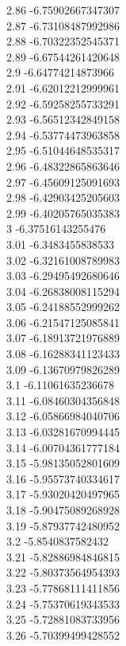 {2.86	-6.75902667347307\\
2.87	-6.73108487992986\\
2.88	-6.70322352545371\\
2.89	-6.67544261420648\\
2.9	-6.64774214873966\\
2.91	-6.62012212999961\\
2.92	-6.59258255733291\\
2.93	-6.56512342849158\\
2.94	-6.53774473963858\\
2.95	-6.51044648535317\\
2.96	-6.48322865863646\\
2.97	-6.45609125091693\\
2.98	-6.42903425205603\\
2.99	-6.40205765035383\\
3	-6.37516143255476\\
3.01	-6.3483455838533\\
3.02	-6.32161008789983\\
3.03	-6.29495492680646\\
3.04	-6.26838008115294\\
3.05	-6.24188552999262\\
3.06	-6.21547125085841\\
3.07	-6.18913721976889\\
3.08	-6.16288341123433\\
3.09	-6.13670979826289\\
3.1	-6.11061635236678\\
3.11	-6.08460304356848\\
3.12	-6.05866984040706\\
3.13	-6.03281670994445\\
3.14	-6.00704361777184\\
3.15	-5.98135052801609\\
3.16	-5.95573740334617\\
3.17	-5.93020420497965\\
3.18	-5.90475089268928\\
3.19	-5.87937742480952\\
3.2	-5.8540837582432\\
3.21	-5.82886984846815\\
3.22	-5.80373564954393\\
3.23	-5.77868111411856\\
3.24	-5.75370619343533\\
3.25	-5.72881083733956\\
3.26	-5.70399499428552\\
}
